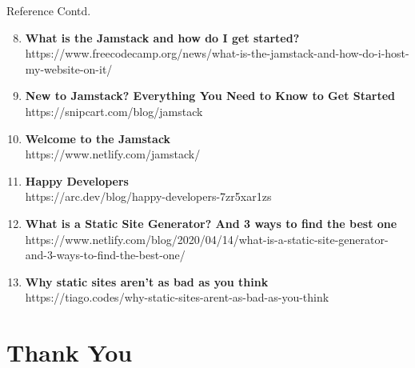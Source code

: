 \documentclass[aspectratio=169,9pt]{beamer}
\begin{document}
\begin{frame}{Reference Contd.}
\begin{footnotesize}
    \begin{enumerate}
        \setcounter{enumi}{7}
        \item \textbf{What is the Jamstack and how do I get started? }https://www.freecodecamp.org/news/what-is-the-jamstack-and-how-do-i-host-my-website-on-it/
        \item \textbf{New to Jamstack? Everything You Need to Know to Get Started}\\https://snipcart.com/blog/jamstack
         \item \textbf{Welcome to the Jamstack} \\https://www.netlify.com/jamstack/
         \item \textbf{Happy Developers} \\https://arc.dev/blog/happy-developers-7zr5xar1zs
         \item \textbf{What is a Static Site Generator? And 3 ways to find the best one} \\https://www.netlify.com/blog/2020/04/14/what-is-a-static-site-generator-and-3-ways-to-find-the-best-one/
         \item \textbf{Why static sites aren’t as bad as you think}
         \\https://tiago.codes/why-static-sites-arent-as-bad-as-you-think
    \end{enumerate}
    \end{footnotesize}
\end{frame}


\section{Thank You}
\end{document}
